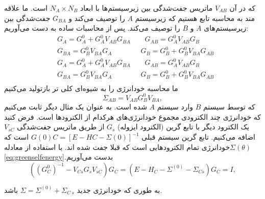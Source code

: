 که در آن $V_{AB}$ ماتریس جفت‌شدگی بین زیرسیستم‌ها با ابعاد $N_A\times N_B$ است. ما علاقه مند به محاسبه تابع  هستیم که زیرسیستم $A$ را توصیف می‌کند و $G_{BA}$ جفت‌شدگی بین زیرسیستم‌های $A$ و $B$ را توصیف می‌کند. پس از محاسبات ساده به دست می‌آوریم:
\begin{equation}
    \begin{split}
          & {{G}_{A}}=G_{A}^{0}+G_{A}^{0}{{V}_{AB}}{{G}_{BA}}\qquad {{G}_{AB}}=G_{A}^{0}{{V}_{AB}}{{G}_{B}} \\ 
         & {{G}_{BA}}=G_{B}^{0}{{V}_{BA}}{{G}_{A}}\qquad \qquad {{G}_{B}}=G_{B}^{0}+G_{B}^{0}{{V}_{BA}}{{G}_{AB}} \\ 
         & {{G}_{A}}=G_{A}^{0}+G_{A}^{0}{{V}_{AB}}{{G}_{BA}}\qquad {{G}_{AB}}=G_{A}^{0}{{V}_{AB}}{{G}_{B}} \\ 
        & {{G}_{BA}}=G_{B}^{0}{{V}_{BA}}{{G}_{A}}\qquad \qquad {{G}_{B}}=G_{B}^{0}+G_{B}^{0}{{V}_{BA}}{{G}_{AB}} \\ 
    \end{split}
    \label{eq:greenselfenergy}
\end{equation}
ما محاسبه خودانرژی را به شیوه‌ای کلی تر بازتولید می‌کنیم 
\begin{equation}
    {{\Sigma }_{AB}}={{V}_{AB}}G_{B}^{0}{{V}_{BA}},
\end{equation}
که توسط سیستم $B$ وارد سیستم $A$ شده است.
به عنوان یک مثال دیگر ثابت می‌کنیم که خودانرژی چند الکترودی مجموع خودانرژی‌های هرکدام از الکترودها است. فرض کنید یک الکترود دیگر با تابع گرین (الکترود ایزوله) $G_s$ از طریق ماتریس جفت‌شدگی $V_{sC}$ اضافه می‌کنیم. تابع گرین سیستم قبلی $G(0)C= [E-HC-\Sigma(0)]^{-1}$ است که $\Sigma(\theta)$خودانرژی تمام الکترودهایی است که قبلا جفت شده اند. با استفاده از معادله \ref{eq:greenselfenergy}.بدست می‌آوریم
\begin{equation}
    \left( {{\left( G_{C}^{0} \right)}^{-1}}-{{V}_{Cs}}{{G}_{s}}{{V}_{sC}} \right){{G}_{C}}=\left( E-{{H}_{C}}-{{\Sigma }^{(0)}}-{{\Sigma }_{Cs}} \right){{G}_{C}}=I,
    \label{eq:firstgreen}
\end{equation}

به طوری که خودانرژی جدید $\Sigma ={{\Sigma }^{(0)}}+{{\Sigma }_{C\ s}}$ باشد. 
